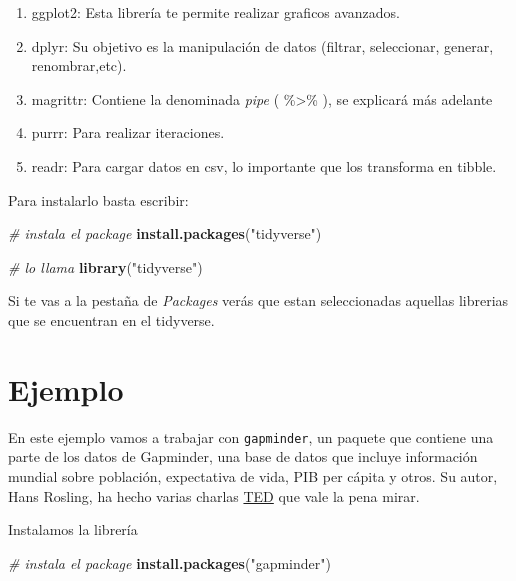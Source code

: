 \documentclass[12pt,]{book}
\newenvironment{Shaded}{\begin{snugshade}}{\end{snugshade}}
\newcommand{\KeywordTok}[1]{\textcolor[rgb]{0.13,0.29,0.53}{\textbf{#1}}}
\newcommand{\StringTok}[1]{\textcolor[rgb]{0.31,0.60,0.02}{#1}}
\newcommand{\CommentTok}[1]{\textcolor[rgb]{0.56,0.35,0.01}{\textit{#1}}}
\newcommand{\NormalTok}[1]{#1}
\providecommand{\tightlist}{%
  \setlength{\itemsep}{0pt}\setlength{\parskip}{0pt}}
\begin{document}
\begin{enumerate}
\def\labelenumi{\arabic{enumi}.}
\tightlist
\item
  ggplot2: Esta librería te permite realizar graficos avanzados.
\item
  dplyr: Su objetivo es la manipulación de datos (filtrar, seleccionar,
  generar, renombrar,etc).
\item
  magrittr: Contiene la denominada \emph{pipe} ( \%\textgreater{}\% ),
  se explicará más adelante
\item
  purrr: Para realizar iteraciones.
\item
  readr: Para cargar datos en csv, lo importante que los transforma en
  tibble.
\end{enumerate}

Para instalarlo basta escribir:

\begin{Shaded}
\begin{Highlighting}[]
\CommentTok{# instala el package}
\KeywordTok{install.packages}\NormalTok{(}\StringTok{"tidyverse"}\NormalTok{)}

\CommentTok{# lo llama}
\KeywordTok{library}\NormalTok{(}\StringTok{"tidyverse"}\NormalTok{)}
\end{Highlighting}
\end{Shaded}

Si te vas a la pestaña de \emph{Packages} verás que estan seleccionadas
aquellas librerias que se encuentran en el tidyverse.

\section{Ejemplo}\label{ejemplo}

En este ejemplo vamos a trabajar con \texttt{gapminder}, un paquete que
contiene una parte de los datos de Gapminder, una base de datos que
incluye información mundial sobre población, expectativa de vida, PIB
per cápita y otros. Su autor, Hans Rosling, ha hecho varias charlas
\href{https://www.ted.com/playlists/474/the_best_hans_rosling_talks_yo}{TED}
que vale la pena mirar.

Instalamos la librería

\begin{Shaded}
\begin{Highlighting}[]
\CommentTok{# instala el package}
\KeywordTok{install.packages}\NormalTok{(}\StringTok{"gapminder"}\NormalTok{)}
\end{Highlighting}
\end{Shaded}
\end{document}
